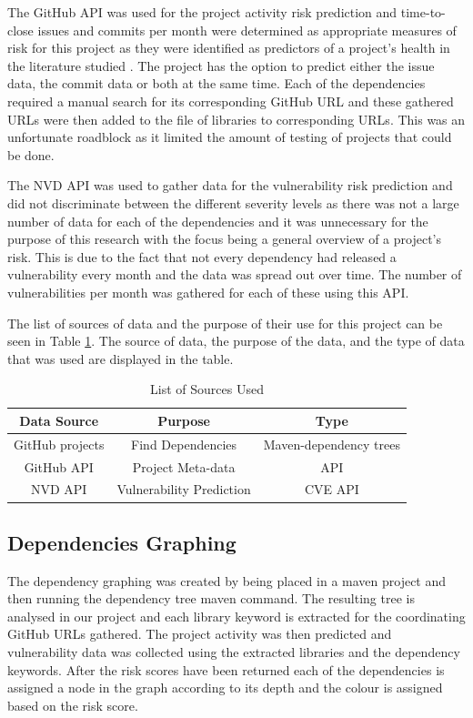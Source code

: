\documentclass[conference]{IEEEtran}
\begin{document}
The GitHub API was used for the project activity risk prediction and time-to-close issues and commits per month were determined as appropriate measures of risk for this project as they were identified as predictors of a project's health in the literature studied \cite{xia_predicting_2022}. The project has the option to predict either the issue data, the commit data or both at the same time. Each of the dependencies required a manual search for its corresponding GitHub URL and these gathered URLs were then added to the file of libraries to corresponding URLs. This was an unfortunate roadblock as it limited the amount of testing of projects that could be done. 

The NVD API was used to gather data for the vulnerability risk prediction and did not discriminate between the different severity levels as there was not a large number of data for each of the dependencies and it was unnecessary for the purpose of this research with the focus being a general overview of a project's risk. This is due to the fact that not every dependency had released a vulnerability every month and the data was spread out over time.  The number of vulnerabilities per month was gathered for each of these using this API. 

The list of sources of data and the purpose of their use for this project can be seen in Table \ref{sourcelist}. The source of data, the purpose of the data, and the type of data that was used are displayed in the table. 

\begin{table}
 \caption{List of Sources Used}
\label{sourcelist}
\begin{center}
\begin{tabular}{|c|c|c|}
\hline
    \textbf{Data Source} & \textbf{Purpose} & \textbf{Type} \\ \hline
    GitHub projects & Find Dependencies & Maven-dependency trees \\ \hline
    GitHub API & Project Meta-data & API  \\ \hline
    NVD API & Vulnerability Prediction & CVE API \\ \hline
\end{tabular}
\end{center}
\end{table}

\subsection{Dependencies Graphing}
The dependency graphing was created by being placed in a maven project and then running the dependency tree maven command. The resulting tree is analysed in our project and each library keyword is extracted for the coordinating GitHub URLs gathered. The project activity was then predicted and vulnerability data was collected using the extracted libraries and the dependency keywords. After the risk scores have been returned each of the dependencies is assigned a node in the graph according to its depth and the colour is assigned based on the risk score.
\end{document}

